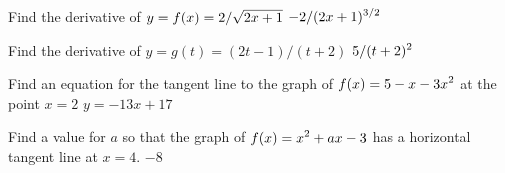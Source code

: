 \exercise
Find the derivative of $\displaystyle y=f(x)=2/\sqrt{2x+1}$ 
\answer $\displaystyle -2/(2x+1)^{3/2}$
\endanswer
\endexercise

\exercise
Find the derivative of $y=g(t)=(2t-1)/(t+2)$
\answer $\displaystyle 5/(t+2)^2$
\endanswer
\endexercise

\exercise
Find an equation for the tangent line to the graph of $\displaystyle f(x)=5-x-3x^2$ at the point $x=2$
\answer $y=-13x+17$
\endanswer
\endexercise

\exercise
Find a value for $a$ so that the graph of $\displaystyle f(x)=x^2+ax-3$ has a horizontal tangent line at $x=4$.
\answer $-8$
\endanswer
\endexercise

\endexercises

